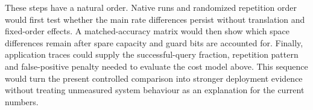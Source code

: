 These steps have a natural order. Native runs and randomized repetition order would first test whether the main rate differences persist without translation and fixed-order effects. A matched-accuracy matrix would then show which space differences remain after spare capacity and guard bits are accounted for. Finally, application traces could supply the successful-query fraction, repetition pattern and false-positive penalty needed to evaluate the cost model above. This sequence would turn the present controlled comparison into stronger deployment evidence without treating unmeasured system behaviour as an explanation for the current numbers.

\FloatBarrier
